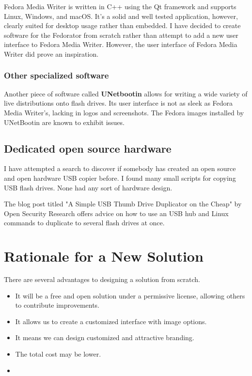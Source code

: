                 Fedora Media Writer is written in C++ using the Qt framework and supports Linux, Windows, and macOS\cite{fedora-media-writer}.  It's a solid and well tested application, however, clearly suited for desktop usage rather than embedded.  I have decided to create software for the Fedorator from scratch rather than attempt to add a new user interface to Fedora Media Writer.  However, the user interface of Fedora Media Writer did prove an inspiration.
                
            \subsubsection{Other specialized software}
                Another piece of software called \textbf{UNetbootin} allows for writing a wide variety of live distributions onto flash drives.  Its user interface is not as sleek as Fedora Media Writer's, lacking in logos and screenshots.  The Fedora images installed by UNetBootin are known to exhibit issues\cite{fedora-how-to-live-usb}\cite{unix-stack-exchange-error-installing-fedora-24}.
            
        \subsection{Dedicated open source hardware}
            I have attempted a search to discover if somebody has created an open source and open hardware USB copier before.  I found many small scripts for copying USB flash drives\cite{github-usbmk}\cite{github-auc-automaticly-usb-copier}\cite{github-udev_serialcopier}.  None had any sort of hardware design.
            
            The blog post titled "A Simple USB Thumb Drive Duplicator on the Cheap" by Open Security Research\cite{open-security-research-simple-duplicator} offers advice on how to use an USB hub and Linux commands to duplicate to several flash drives at once. 
            
    \section{Rationale for a New Solution}
        There are several advantages to designing a solution from scratch.
        
        \begin{itemize}
            \item It will be a free and open solution under a permissive license, allowing others to contribute improvements.
            \item It allows us to create a customized interface with image options.
            \item It means we can design customized and attractive branding.
            \item The total cost may be lower.
            \item {}
        \end{itemize}
        
